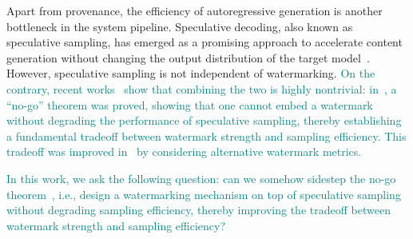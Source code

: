 \documentclass{article}
\theoremstyle{plain}
\theoremstyle{definition}
\begin{document}
Apart from provenance, the efficiency of autoregressive generation is another bottleneck in the system pipeline. 
Speculative decoding, also known as speculative sampling, has emerged as a promising approach to accelerate content generation without changing the output distribution of the target model~\citep{chen2023accelerating, leviathan2023fast}. 
However, speculative sampling is not independent of watermarking.
\textcolor{teal}{On the contrary, recent works~\citep{hu2024inevitable, he2026improving} show that combining the two is highly nontrivial: in~\citep{hu2024inevitable}, a ``no-go'' theorem was proved, showing that one cannot embed a watermark without degrading the performance of speculative sampling, thereby establishing a fundamental tradeoff between watermark strength and sampling efficiency.
This tradeoff was improved in~\citep{he2026improving} by considering alternative watermark metrics. }


\textcolor{teal}{In this work, we ask the following question: can we somehow sidestep the no-go theorem~\citep{hu2024inevitable}, i.e., design a watermarking mechanism on top of speculative sampling without degrading sampling efficiency, thereby improving the tradeoff between watermark strength and sampling efficiency?}
\end{document}
